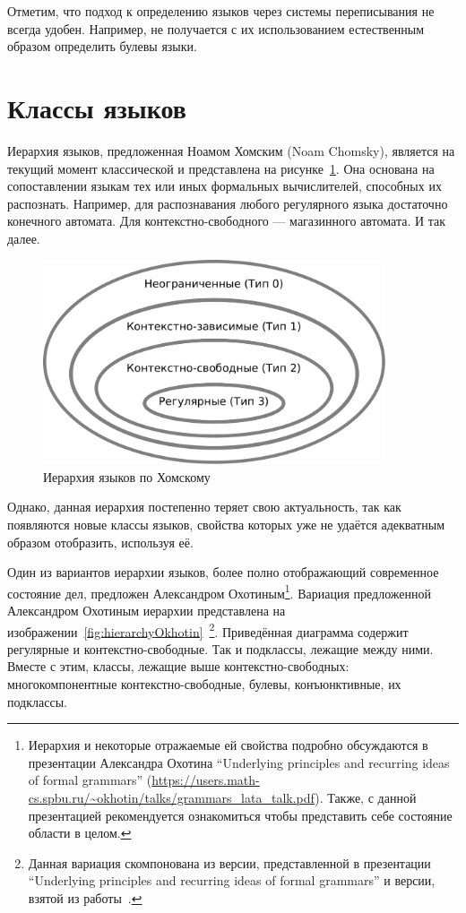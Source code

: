 Отметим, что подход к определению языков через системы переписывания не всегда удобен. Например, не получается с их использованием естественным образом определить булевы языки.


\section{Классы языков}

Иерархия языков, предложенная Ноамом Хомским (Noam Chomsky), является на текущий момент классической и представлена на рисунке~\ref{fig:Chomsky}.
Она основана на сопоставлении языкам тех или иных формальных вычислителей, способных их распознать. 
Например, для распознавания любого регулярного языка достаточно конечного автомата. Для контекстно-свободного --- магазинного автомата. И так далее.


\begin{figure}
  \begin{center}
  \includegraphics[width=0.9\textwidth]{figures/Chomsky.pdf}
  \end{center}
  \caption{Иерархия языков по Хомскому}
  \label{fig:Chomsky}
\end{figure}

Однако, данная иерархия постепенно теряет свою актуальность, так как появляются новые классы языков, свойства которых уже не удаётся адекватным образом отобразить, используя её. 

Один из вариантов иерархии языков, более полно отображающий современное состояние дел, предложен Александром Охотиным\footnote{Иерархия и некоторые отражаемые ей свойства подробно обсуждаются в презентации Александра Охотина ``Underlying principles
and recurring ideas of formal grammars'' (\url{https://users.math-cs.spbu.ru/~okhotin/talks/grammars_lata_talk.pdf}).
Также, с данной презентацией рекомендуется ознакомиться чтобы представить себе состояние области в целом.}.
Вариация предложенной Александром Охотиным иерархии представлена на изображении~\ref{fig:hierarchyOkhotin}~\footnote{Данная вариация скомпонована из версии, представленной в презентации ``Underlying principles
and recurring ideas of formal grammars'' и версии, взятой из работы~\cite{MRYKHIN2023113829}.}.
Приведённая диаграмма содержит регулярные и контекстно-свободные.
Так и подклассы, лежащие между ними.
Вместе с этим, классы, лежащие выше контекстно-свободных: многокомпонентные контекстно-свободные, булевы, конъюнктивные, их подклассы.

